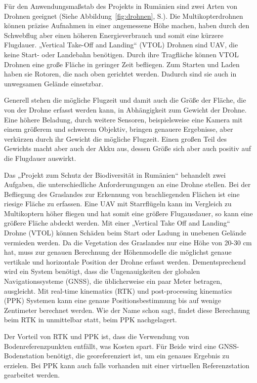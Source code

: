 Für den Anwendungsmaßstab des Projekts in Rumänien sind zwei Arten von Drohnen geeignet (Siehe Abbildung~\ref{fig:drohnen}, S.\pageref{fig:drohnen}). Die Multikopterdrohnen können präzise Aufnahmen in einer angemessene Höhe machen, haben durch den Schwebflug aber einen höheren Energieverbrauch und somit eine kürzere Flugdauer. „Vertical Take-Off and Landing“ (VTOL) Drohnen sind UAV, die keine Start- oder Landebahn benötigen. Durch ihre Tragfläche können VTOL Drohnen eine große Fläche in geringer Zeit befliegen. Zum Starten und Laden haben sie Rotoren, die nach oben gerichtet werden. Dadurch sind sie auch in unwegsamen Gelände einsetzbar.

Generell stehen die mögliche Flugzeit und damit auch die Größe der Fläche, die von der Drohne erfasst werden kann, in Abhängigkeit zum Gewicht der Drohne. Eine höhere Beladung, durch weitere Sensoren, beispielsweise eine Kamera mit einem größerem und schwerem Objektiv, bringen genauere Ergebnisse, aber verkürzen durch ihr Gewicht die mögliche Flugzeit. Einen großen Teil des Gewichts macht aber auch der Akku aus, dessen Größe sich aber auch positiv auf die Flugdauer auswirkt.

Das „Projekt zum Schutz der Biodiversität in Rumänien“ behandelt zwei Aufgaben, die unterschiedliche Anforderungungen an eine Drohne stellen. Bei der Befliegung des Graslandes zur Erkennung von brachliegenden Flächen ist eine riesige Fläche zu erfassen. Eine UAV mit Starrflügeln kann im Vergleich zu Multikoptern höher fliegen und hat somit eine größere Flugausdauer, so kann eine größere Fläche abdeckt werden. Mit einer „Vertical Take Off and Landing“ Drohne (VTOL) können Schäden beim Start oder Ladung in unebenen Gelände vermieden werden. Da die Vegetation des Graslandes nur eine Höhe von 20-30 cm hat, muss zur genauen Berechnung der Höhenmodelle die möglichst genaue vertikale und horizontale Position der Drohne erfasst werden. Dementsprechend wird ein System  benötigt, dass die Ungenauigkeiten der globalen Navigationssysteme (GNSS), die üblicherweise ein paar Meter betragen, ausgleicht. Mit real-time kinematics (RTK) und post-processing kinematics (PPK) Systemen kann eine genaue Positionsbestimmung bis auf wenige Zentimeter berechnet werden. Wie der Name schon sagt, findet diese Berechnung beim RTK in unmittelbar statt, beim PPK nachgelagert. 

Der Vorteil von RTK und PPK ist, dass die Verwendung von Bodenreferenzpunkten entfällt, was Kosten spart. Für Beide wird eine GNSS-Bodenstation benötigt, die georeferenziert ist, um ein genaues Ergebnis zu erzielen. Bei PPK kann auch falls vorhanden mit einer virtuellen Referenzstation gearbeitet werden. 

